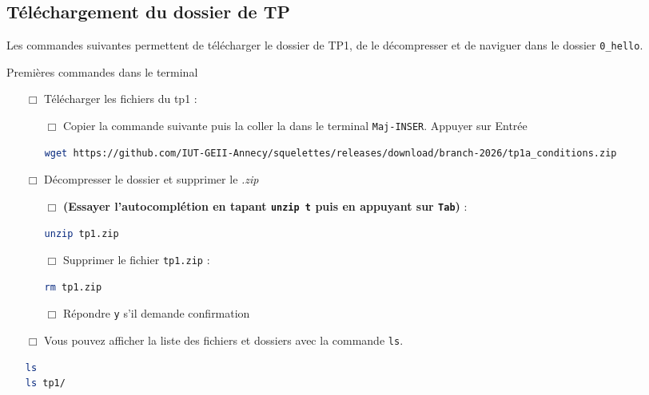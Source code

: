 \subsection{Téléchargement du dossier de TP}

Les commandes suivantes permettent de télécharger le dossier de TP1, de le décompresser et de naviguer dans le dossier \texttt{0\_hello}.



\begin{UPSTIManipulation}{Premières commandes dans le terminal}
	\begin{itemize}
		\item[$\Box$] Télécharger les fichiers du tp1 :
		      \begin{itemize}
			      \item[$\Box$] Copier la commande suivante puis la coller la dans le terminal \texttt{Maj-INSER}. Appuyer sur Entrée
			            \begin{lstlisting}[language=bash,style=console]
wget https://github.com/IUT-GEII-Annecy/squelettes/releases/download/branch-2026/tp1a_conditions.zip
\end{lstlisting}
		      \end{itemize}
		\item[$\Box$] Décompresser le dossier et supprimer le \textit{.zip}
		      \begin{itemize}
			      \item[$\Box$] \textbf{(Essayer l'autocomplétion en tapant \texttt{unzip t} puis en appuyant sur \texttt{Tab})} :
			            \begin{lstlisting}[language=bash,style=console]
unzip tp1.zip
\end{lstlisting}
			      \item[$\Box$] Supprimer le fichier \texttt{tp1.zip} :
			            \begin{lstlisting}[language=bash,style=console]
rm tp1.zip
\end{lstlisting}
			      \item[$\Box$] Répondre \texttt{y} s'il demande confirmation
		      \end{itemize}
		\item[$\Box$] Vous pouvez afficher la liste des fichiers et dossiers avec la commande \texttt{ls}.
		      \begin{lstlisting}[language=bash,style=console]
ls
ls tp1/
\end{lstlisting}

\end{itemize}
\end{UPSTIManipulation}
